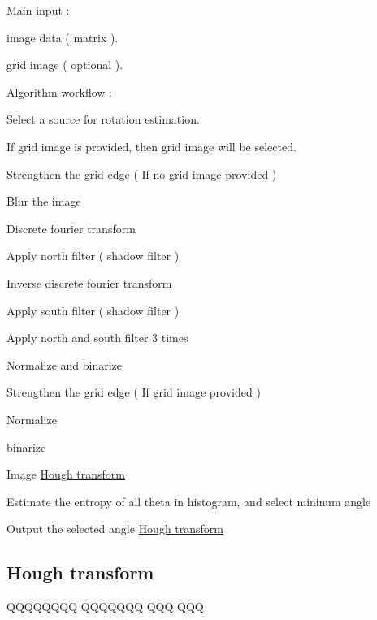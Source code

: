 Main input \-: \par

\begin{DoxyItemize}
\item image data ( matrix ).
\item grid image ( optional ). \par

\end{DoxyItemize}

Algorithm workflow \-: \par

\begin{DoxyEnumerate}
\item Select a source for rotation estimation. \par
 If grid image is provided, then grid image will be selected.
\item Strengthen the grid edge ( If no grid image provided )
\begin{DoxyEnumerate}
\item Blur the image
\item Discrete fourier transform
\item Apply north filter ( shadow filter )
\item Inverse discrete fourier transform
\item Apply south filter ( shadow filter )
\item Apply north and south filter 3 times
\item Normalize and binarize
\end{DoxyEnumerate}
\item Strengthen the grid edge ( If grid image provided )
\begin{DoxyEnumerate}
\item Normalize
\item binarize
\end{DoxyEnumerate}
\item Image \hyperlink{hough_transform}{Hough transform}
\item Estimate the entropy of all theta in histogram, and select mininum angle
\item Output the selected angle \hyperlink{hough_transform}{Hough transform} 
\end{DoxyEnumerate}\hypertarget{hough_transform}{}\subsection{Hough transform}\label{hough_transform}
Q\-Q\-Q\-Q\-Q\-Q\-Q\-Q Q\-Q\-Q\-Q\-Q\-Q\-Q Q\-Q\-Q Q\-Q\-Q 